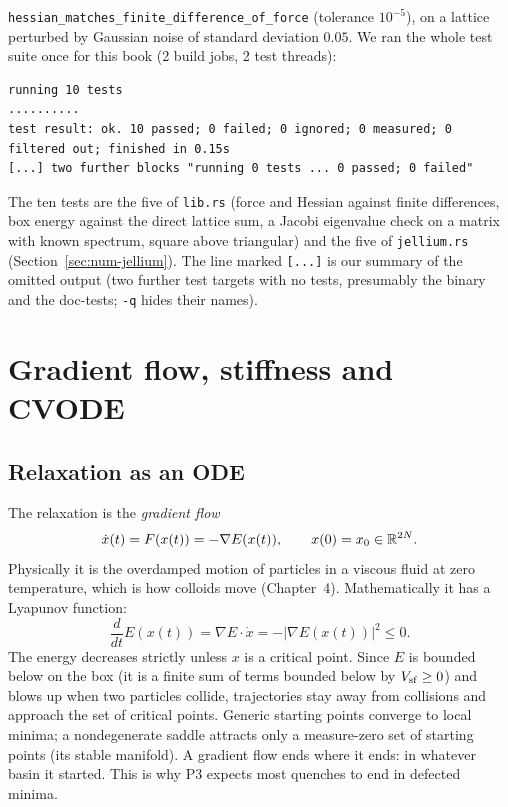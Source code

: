 \texttt{hessian\_\allowbreak matches\_\allowbreak finite\_\allowbreak difference\_\allowbreak of\_\allowbreak force} (tolerance $10^{-5}$), on a lattice perturbed by Gaussian noise of
standard deviation $0.05$. We ran the whole test suite once for this book (2 build jobs, 2 test threads):
\begin{lstlisting}[language={},title={cargo test -q --release -j 2 --offline -p qf-yukawa-crystal --manifest-path .../Cargo.toml -- --test-threads=2}]
running 10 tests
..........
test result: ok. 10 passed; 0 failed; 0 ignored; 0 measured; 0 filtered out; finished in 0.15s
[...] two further blocks "running 0 tests ... 0 passed; 0 failed"
\end{lstlisting}
The ten tests are the five of \texttt{lib.rs} (force and Hessian against finite differences, box energy against the
direct lattice sum, a Jacobi eigenvalue check on a matrix with known spectrum, square above triangular) and the five of
\texttt{jellium.rs} (Section~\ref{sec:num-jellium}). The line marked \texttt{[...]} is our summary of the omitted output (two further test targets with no tests, presumably
the binary and the doc-tests; \texttt{-q} hides their names).

\section{Gradient flow, stiffness and CVODE}\label{sec:num-flow}

\subsection{Relaxation as an ODE}
The relaxation is the \emph{gradient flow}
\begin{equation}\label{eq:gflow}
\dot x(t)=F(x(t))=-\nabla E(x(t)),\qquad x(0)=x_0\in\mathbb{R}^{2N}.
\end{equation}
Physically it is the overdamped motion of particles in a viscous fluid at zero temperature, which is how colloids move
(Chapter~4). Mathematically it has a Lyapunov function:
\begin{equation}
\frac{d}{dt}E(x(t))=\nabla E\cdot\dot x=-|\nabla E(x(t))|^2\le0 .
\end{equation}
The energy decreases strictly unless $x$ is a critical point. Since $E$ is bounded below on the box (it is a finite
sum of terms bounded below by $V_{\rm sf}\ge0$) and blows up when two particles collide, trajectories stay away from
collisions and approach the set of critical points. Generic starting points converge to local minima; a nondegenerate saddle attracts
only a measure-zero set of starting points (its stable manifold). A gradient flow ends where it ends: in whatever basin it started. This is
why P3 expects most quenches to end in defected minima.

